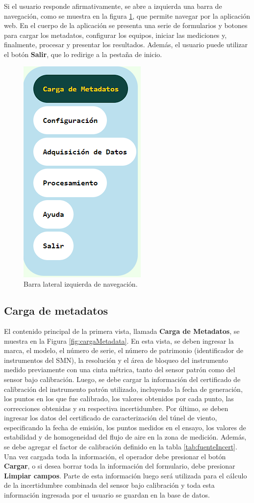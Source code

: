 Si el usuario responde afirmativamente, se abre a izquierda una barra de navegación, como se muestra en la figura \ref{fig:barraNavegIzq}, que permite navegar por la aplicación web. En el cuerpo de la aplicación se presenta una serie de formularios y botones para cargar los metadatos, configurar los equipos, iniciar las mediciones y, finalmente, procesar y presentar los resultados. Además, el usuario puede utilizar el botón \textbf{Salir}, que lo redirige a la pestaña de inicio.

\begin{figure}[H]
    \centering
    \includegraphics[width=0.2\linewidth]{Figuras/AplicacionWeb/frontend/barraNavegIzq.png}
    \caption{Barra lateral izquierda de navegación.}
    \label{fig:barraNavegIzq}
\end{figure}
\subsection{Carga de metadatos}\label{sec:cargaMetadatos}

El contenido principal de la primera vista, llamada \textbf{Carga de Metadatos}, se muestra en la Figura \ref{fig:cargaMetadata}. En esta vista, se deben ingresar la marca, el modelo, el número de serie, el número de patrimonio (identificador de instrumentos del SMN), la resolución y el área de bloqueo del instrumento medido previamente con una cinta métrica, tanto del sensor patrón como del sensor bajo calibración. Luego, se debe cargar la información del certificado de calibración del instrumento patrón utilizado, incluyendo la fecha de generación, los puntos en los que fue calibrado, los valores obtenidos por cada punto, las correcciones obtenidas y su respectiva incertidumbre. Por último, se deben ingresar los datos del certificado de caracterización del túnel de viento, especificando la fecha de emisión, los puntos medidos en el ensayo, los valores de estabilidad y de homogeneidad del flujo de aire en la zona de medición. Además, se debe agregar el factor de calibración definido en la tabla \ref{tab:fuenteIncert}. Una vez cargada toda la información, el operador debe presionar el botón \textbf{Cargar}, o si desea borrar toda la información del formulario, debe presionar \textbf{Limpiar campos}. Parte de esta información luego será utilizada para el cálculo de la incertidumbre combinada del sensor bajo calibración y toda esta información ingresada por el usuario se guardan en la base de datos.

